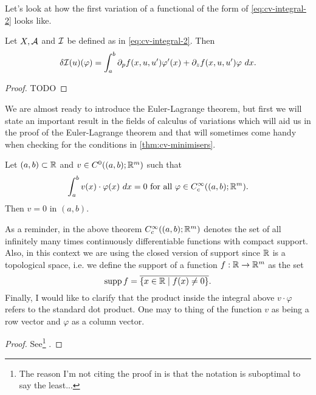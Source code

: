 Let's look at how the first variation of a functional of the form of
\eqref{eq:cv-integral-2} looks like.

\begin{lem}
  Let $X, \mathcal{A}$ and $\mathcal{I}$ be defined as in \eqref{eq:cv-integral-2}. Then
  \begin{equation}
    \label{eq:fv-integral}
    \delta \mathcal{I} (u) (\varphi)
    = \int_a^b \partial_p f(x, u, u') \varphi'(x) + \partial_z f(x, u, u') \varphi\ dx.
  \end{equation}
\end{lem}

\begin{proof}
  TODO
\end{proof}




We are almost ready to introduce the Euler-Lagrange theorem, but first we will
state an important result in the fields of calculus of variations which will
aid us in the proof of the Euler-Lagrange theorem and that will sometimes come
handy when checking for the conditions in \autoref{thm:cv-minimisers}.

\begin{thm}
  \label{thm:cv-fundamental}

  Let $(a, b) \subset \mathbb{R}$ and $v \in C^0((a, b); \mathbb{R}^m)$ such that
  \[
    \int_a^b v(x) \cdot \varphi(x) \ dx = 0 \text{ for all } \varphi \in C_c^\infty ((a, b); \mathbb{R}^m).
  \]
  Then $v = 0$ in $(a, b)$.
\end{thm}

As a reminder, in the above theorem $C_c^\infty((a, b); \mathbb{R}^m)$ denotes the set
of all infinitely many times continuously differentiable functions with compact
support. Also, in this context we are using the closed version of support since
$\mathbb{R}$ is a topological space, i.e. we define the support of a function $f : \mathbb{R}
\to \mathbb{R}^m$ as the set
\[
  \operatorname{supp} f = \overline{ \{ x \in \mathbb{R} \mid f(x) \neq 0 \} }.
\]
Finally, I would like to clarify that the product inside the integral above $v
\cdot \varphi$ refers to the standard dot product. One may to thing of the
function $v$ as being a row vector and $\varphi$ as a column vector.

\begin{proof}
  See\footnote{The reason I'm not citing the proof in
  \cite{eck2017mathematical} is that the notation is suboptimal to say the
  least...} \cite[p. 6]{jost1998calculus}.
\end{proof}

